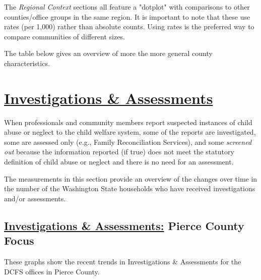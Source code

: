 \documentclass{article}
\begin{document}
The \emph{Regional Context} sections all feature a "dotplot" with comparisons to other counties/office groups in the same region. It is important to note that these use rates (per 1,000) rather than absolute counts. Using rates is the preferred way to compare communities of different sizes.

The table below gives an overview of more the more general county characteristics.




\section{\href{http://www.partnersforourchildren.org//child-well-being/visualizations/investigations-assessments/trends}
{Investigations \& Assessments}}
When professionals and community members report suspected instances of child abuse or neglect to the child welfare system, some of the reports are investigated, some are assessed only (e.g., Family Reconciliation Services), and some \emph{screened out} because the information reported (if true) does not meet the statutory definition of child abuse or neglect and there is no need for an assessment.

The measurements in this section provide an overview of the changes over time in the number of the Washington State households who have received investigations and/or assessments.

\subsection{\href{http://www.partnersforourchildren.org//child-well-being/visualizations/investigations-assessments/trends}
{Investigations \& Assessments:} Pierce County Focus}
These graphs show the recent trends in Investigations \& Assessments for the DCFS offices in
Pierce County.
\end{document}
